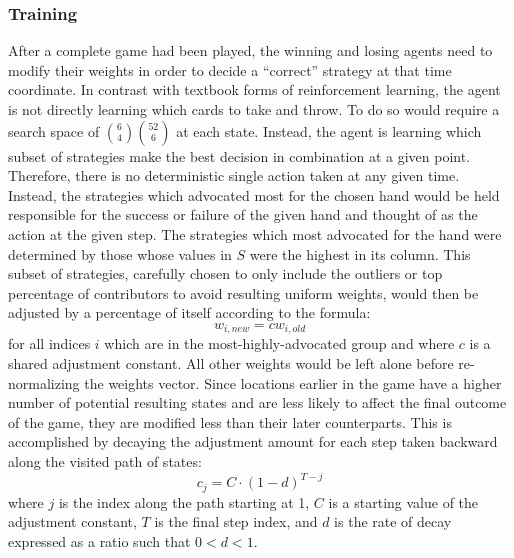 
\subsubsection{Training}





After a complete game had been played, the winning and losing agents need to
modify their weights in order to decide a ``correct'' strategy at that time
coordinate.
%
In contrast with textbook forms of reinforcement learning,
the agent is not directly learning which cards to take and throw.
%
To do so would require a search space of ${6 \choose 4}{52 \choose 6}$
at each state.
%
Instead, the agent is learning which subset of strategies make the best
decision in combination at a given point.
%
Therefore, there is no deterministic single action taken at any given
time.
%
Instead, the strategies which advocated most for the chosen hand would be held
responsible for the success or failure of the given hand and thought of as
the action at the given step.
%
The strategies which most advocated for the hand were determined by those whose
values in $S$ were the highest in its column.
%
This subset of strategies,
carefully chosen to only include the outliers or top percentage of contributors
to avoid resulting uniform weights,
would then be adjusted by a percentage of itself according to the formula:
\[
	w_{i,new} = c w_{i,old}
\]
for all indices $i$ which are in the most-highly-advocated group and
where $c$ is a shared adjustment constant.
%
All other weights would be left alone before re-normalizing the weights vector.
%
Since locations earlier in the game have a higher number of potential resulting
states and are less likely to affect the final outcome of the game,
they are modified less than their later counterparts.
%
This is accomplished by decaying the adjustment amount for each step taken
backward along the visited path of states:
\[
	c_j = C \cdot (1 - d)^{T-j}
\]
where $j$ is the index along the path starting at 1,
$C$ is a starting value of the adjustment constant,
$T$ is the final step index,
and $d$ is the rate of decay expressed as a ratio such that $0 < d < 1$.

